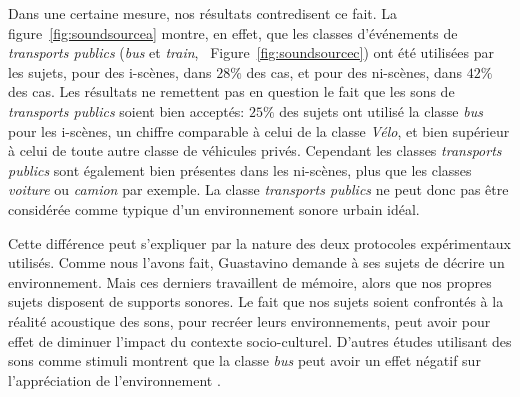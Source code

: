 \documentclass[twoside,twocolumn]{article}
\begin{document}
Dans une certaine mesure, nos résultats contredisent ce fait. La figure~\ref{fig:soundsourcea} montre, en effet, que les classes d'événements de \emph{transports publics} (\emph{bus} et \emph{train}, \cf~Figure~\ref{fig:soundsourcec}) ont été utilisées par les sujets, pour des i-scènes, dans $28\%$ des cas, et pour des ni-scènes, dans $42\%$ des cas. Les résultats ne remettent pas en question le fait que les sons de \emph{transports publics} soient bien acceptés: $25\%$ des sujets ont utilisé la classe \emph{bus} pour les i-scènes, un chiffre comparable à celui de la classe \emph{Vélo}, et bien supérieur à celui de toute autre classe de véhicules privés. Cependant les classes \emph{transports publics} sont également bien présentes dans les ni-scènes, plus que les classes \emph{voiture} ou \emph{camion} par exemple. La classe \emph{transports publics} ne peut donc pas être considérée comme typique d'un environnement sonore urbain idéal.

Cette différence peut s'expliquer par la nature des deux protocoles expérimentaux utilisés. Comme nous l'avons fait, Guastavino demande à ses sujets de décrire un environnement. Mais ces derniers travaillent de mémoire, alors que nos propres sujets disposent de supports sonores. Le fait que nos sujets soient confrontés à la réalité acoustique des sons, pour recréer leurs environnements, peut avoir pour effet de diminuer l'impact du contexte socio-culturel. D'autres études utilisant des sons comme stimuli montrent que la classe \emph{bus} peut avoir un effet négatif sur l'appréciation de l'environnement \cite{lavandier2006contribution}.
\end{document}
